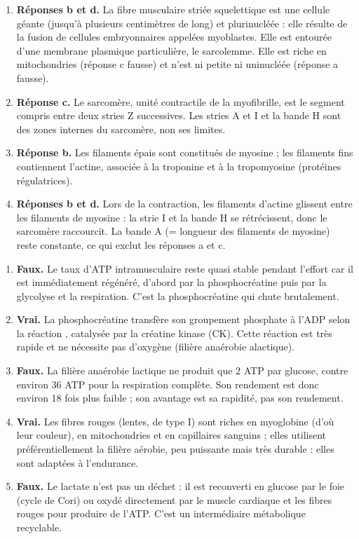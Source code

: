 \documentclass[11pt]{article}
\newcommand{\cle}[1]{{\popxbold\color{popdark}#1}}
\begin{document}
\begin{corrige}
\begin{enumerate}
\item \textbf{Réponses b et d.} La fibre musculaire striée squelettique est une cellule géante (jusqu'à plusieurs centimètres de long) et plurinucléée : elle résulte de la fusion de cellules embryonnaires appelées \cle{myoblastes}. Elle est entourée d'une membrane plasmique particulière, le \cle{sarcolemme}. Elle est riche en mitochondries (réponse c fausse) et n'est ni petite ni uninucléée (réponse a fausse).
\item \textbf{Réponse c.} Le \cle{sarcomère}, unité contractile de la myofibrille, est le segment compris entre deux \cle{stries Z} successives. Les stries A et I et la bande H sont des zones internes du sarcomère, non ses limites.
\item \textbf{Réponse b.} Les filaments épais sont constitués de \cle{myosine} ; les filaments fins contiennent l'actine, associée à la troponine et à la tropomyosine (protéines régulatrices).
\item \textbf{Réponses b et d.} Lors de la contraction, les filaments d'actine glissent entre les filaments de myosine : la strie I et la bande H se rétrécissent, donc le sarcomère raccourcit. La bande A (= longueur des filaments de myosine) reste constante, ce qui exclut les réponses a et c.
\end{enumerate}
\end{corrige}

\begin{corrige}
\begin{enumerate}
\item \textbf{Faux.} Le taux d'ATP intramusculaire reste quasi stable pendant l'effort car il est immédiatement régénéré, d'abord par la phosphocréatine puis par la glycolyse et la respiration. C'est la phosphocréatine qui chute brutalement.
\item \textbf{Vrai.} La phosphocréatine transfère son groupement phosphate à l'ADP selon la réaction , catalysée par la \cle{créatine kinase} (CK). Cette réaction est très rapide et ne nécessite pas d'oxygène (filière anaérobie alactique).
\item \textbf{Faux.} La filière anaérobie lactique ne produit que 2 ATP par glucose, contre environ 36 ATP pour la respiration complète. Son rendement est donc environ 18 fois plus faible ; son avantage est sa rapidité, pas son rendement.
\item \textbf{Vrai.} Les fibres rouges (lentes, de type I) sont riches en myoglobine (d'où leur couleur), en mitochondries et en capillaires sanguins ; elles utilisent préférentiellement la filière aérobie, peu puissante mais très durable : elles sont adaptées à l'endurance.
\item \textbf{Faux.} Le lactate n'est pas un déchet : il est reconverti en glucose par le foie (cycle de Cori) ou oxydé directement par le muscle cardiaque et les fibres rouges pour produire de l'ATP. C'est un intermédiaire métabolique recyclable.
\end{enumerate}
\end{corrige}
\end{document}
